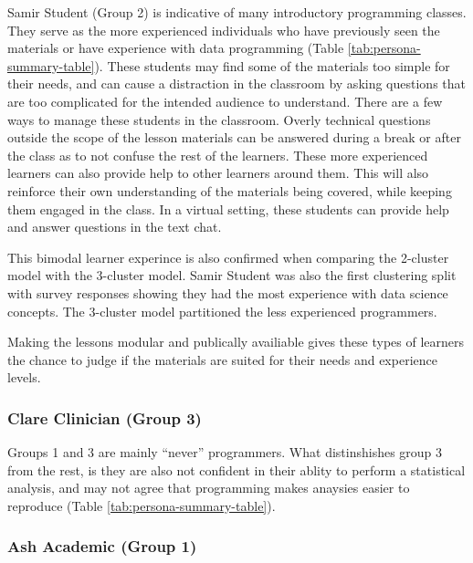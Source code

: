 \documentclass[020-persona_validation.tex]{subfiles}
\begin{document}
            Samir Student (Group 2) is indicative of many introductory programming classes.
            They serve as the more experienced individuals who have previously seen the materials
            or have experience with data programming (Table \ref{tab:persona-summary-table}).
            These students may find some of the materials too simple for their needs,
            and can cause a distraction in the classroom by asking questions that are too complicated
            for the intended audience to understand.
            There are a few ways to manage these students in the classroom.
            Overly technical questions outside the scope of the lesson materials
            can be answered during a break or after the class as to not confuse the rest of the learners.
            These more experienced learners can also provide help to other learners around them.
            This will also reinforce their own understanding of the materials being covered,
            while keeping them engaged in the class.
            In a virtual setting,
            these students can provide help and answer questions in the text chat.

            This bimodal learner experince is also confirmed when comparing the
            2-cluster model with the 3-cluster model. %
            Samir Student was also the first clustering split with survey responses showing
            they had the most experience with data science concepts.
            The 3-cluster model partitioned the less experienced programmers.

            Making the lessons modular and publically availiable
            gives these types of learners the chance to judge if the materials are suited for their needs
            and experience levels.

        \subsubsection{Clare Clinician (Group 3)}

            Groups 1 and 3 are mainly ``never'' programmers.
            What distinshishes group 3 from the rest, is they are also not confident in
            their ablity to perform a statistical analysis,
            and may not agree that programming makes anaysies easier to reproduce (Table \ref{tab:persona-summary-table}).

        \subsubsection{Ash Academic (Group 1)}
\end{document}
